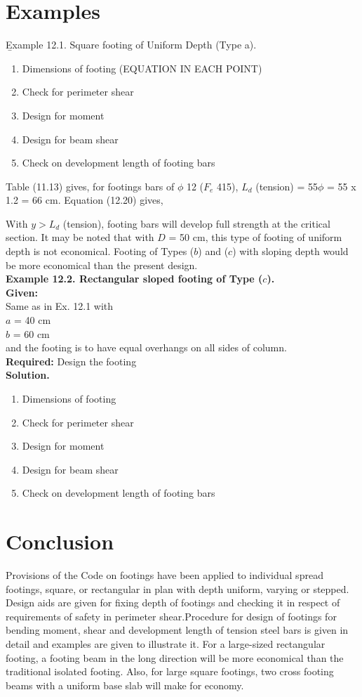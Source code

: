 \documentclass{book}
\begin{document}
\section{Examples}
\b Example 12.1. Square footing of Uniform Depth (Type a).
\begin{enumerate}
\item Dimensions of footing (EQUATION IN EACH POINT)
\item  Check for perimeter shear
\item  Design for moment
\item Design for beam shear
\item Check on development length of footing bars
\end{enumerate}
Table (11.13) gives, for footings bars of $\phi$ 12 ($F_e$ 415),
\newpage
$L_d$ (tension) = 55$\phi$ = 55 x 1.2 = 66 cm.
Equation (12.20) gives,


With $y > L_d$ (tension), footing bars will develop full strength at the critical section. It may be noted that with $D$ = 50 cm, this type of footing of uniform depth is not economical. Footing of Types ($b$) and ($c$) with sloping depth would be more economical than the present design.\\

\textbf{ Example 12.2. Rectangular sloped footing of Type ($c$).}\\
\textbf{Given:}\\
Same as in Ex. 12.1 with\\
$a$ = 40 cm\\
$b$ = 60 cm\\
and the footing is to have equal overhangs on all sides of column.\\
\textbf{Required:} Design the footing\\
\textbf{Solution.}
\begin{enumerate}
\item  Dimensions of footing
\item Check for perimeter shear
\item Design for moment
\item Design for beam shear
\item Check on development length of footing bars
\end{enumerate}
\newpage
\section{Conclusion}
Provisions of the Code on footings have been applied to individual spread footings, square, or rectangular in plan with depth uniform, varying or stepped. Design aids are given for ﬁxing depth of footings and checking it in respect of requirements of safety in perimeter shear.Procedure for design of footings for bending moment, shear and development length of tension steel bars is given in detail and examples are given to illustrate it. For a large-sized rectangular footing, a footing beam in the long direction will be more economical than the traditional isolated footing. Also, for large square footings, two cross footing beams with a uniform base slab will make for economy.
\end{document}
